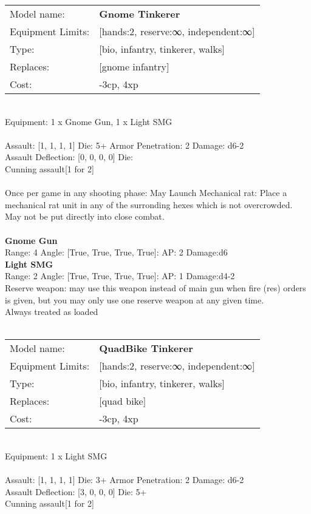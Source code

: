 \noindent
\begin{tabular}{ll}
Model name: &{\bf Gnome Tinkerer } \\
Equipment Limits: &[hands:2, reserve:∞, independent:∞] \\
Type: &[bio, infantry, tinkerer, walks] \\
Replaces: &[gnome infantry] \\
Cost: & -3cp, 4xp\\
\end{tabular}
\ \\
Equipment: 1 x Gnome Gun, 1 x Light SMG \\
\ \\
Assault: [1, 1, 1, 1] Die: 5+ Armor Penetration: 2 Damage: d6-2 \\
Assault Deflection: [0, 0, 0, 0] Die: \\
\indent Cunning assault[1 for 2]\\ 
 
\ \\
Once per game in any shooting phase: May Launch Mechanical rat: Place a mechanical rat unit in any of the surronding hexes which is not overcrowded. May not be put directly into close combat. \\ 

\ \\
{\bf Gnome Gun } \\



Range: 4  Angle: [True, True, True, True]: AP: 2 Damage:d6 \\




{\bf Light SMG } \\



Range: 2  Angle: [True, True, True, True]: AP: 1 Damage:d4-2 \\
Reserve weapon: may use this weapon instead of main gun when fire (res) orders is given, but you may only use one reserve weapon at any given time.\\ 
Always treated as loaded\\ 




 
\ \\

\noindent
\begin{tabular}{ll}
Model name: &{\bf QuadBike Tinkerer } \\
Equipment Limits: &[hands:2, reserve:∞, independent:∞] \\
Type: &[bio, infantry, tinkerer, walks] \\
Replaces: &[quad bike] \\
Cost: & -3cp, 4xp\\
\end{tabular}
\ \\
Equipment: 1 x Light SMG \\
\ \\
Assault: [1, 1, 1, 1] Die: 3+ Armor Penetration: 2 Damage: d6-2 \\
Assault Deflection: [3, 0, 0, 0] Die: 5+\\
\indent Cunning assault[1 for 2]\\ 
 
